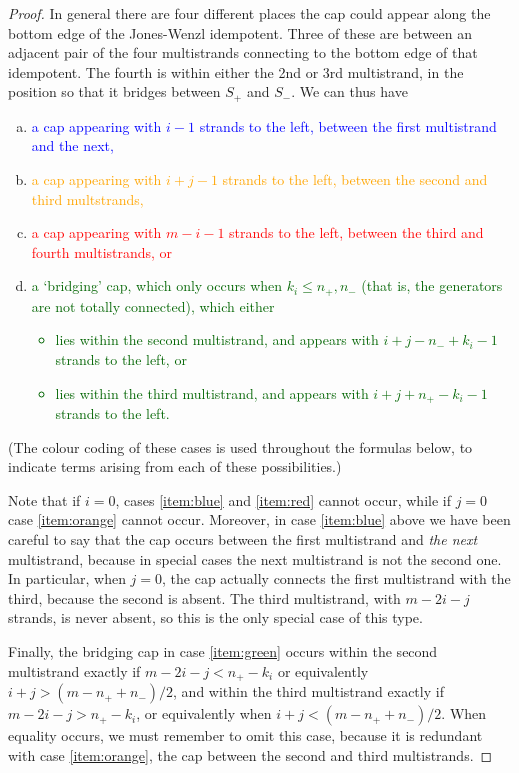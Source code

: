 \documentclass[12pt]{article}
\begin{document}
\begin{proof}
In general there are four different places the cap could appear along the bottom edge of the Jones-Wenzl idempotent. Three of these are between an adjacent pair of the four multistrands connecting to the bottom edge of that idempotent. The fourth is within either the 2nd or 3rd multistrand, in the position so that it bridges between $S_+$ and $S_-$.
We can thus have
\begin{enumerate}[(a)]
\item
\label{item:blue}
\textcolor{blue}{
a cap appearing with $i-1$ strands to the left, between the first multistrand and the next,
}
\item
\label{item:orange}
\textcolor{orange}{
a cap appearing with $i+j-1$ strands to the left, between the second and third multstrands,
}
\item
\label{item:red}
\textcolor{red}{
a cap appearing with $m-i-1$ strands to the left, between the third and fourth multistrands, or
}
\item
\label{item:green}
\textcolor{DarkGreen}{
a `bridging' cap, which only occurs when $k_i \leq n_+, n_-$ (that is, the generators are not totally connected),
which either
\begin{itemize}
\item lies within the second multistrand, and appears with $i+j-n_-+k_i - 1$ strands to the left, or
\item lies within the third multistrand, and appears with $i+j+n_+-k_i -1$ strands to the left.
\end{itemize}
}
\end{enumerate}
(The colour coding of these cases is used throughout the formulas below, to indicate terms arising from each of these possibilities.)

Note that if $i=0$, cases \eqref{item:blue} and \eqref{item:red} cannot occur, while if $j=0$ case \eqref{item:orange} cannot occur. Moreover, in case \eqref{item:blue} above we have been careful to say that the cap occurs between the first multistrand and \emph{the next} multistrand, because in special cases the next multistrand is not the second one. In particular, when $j=0$, the cap actually connects the first multistrand with the third, because the second is absent. The third multistrand, with $m-2i-j$ strands, is never absent, so this is the only special case of this type.

Finally, the bridging cap in case \eqref{item:green} occurs within the second multistrand exactly if $m-2i-j < n_+ - k_i$ or equivalently $i+j > (m - n_+ + n_-)/2$, and within the third multistrand exactly if $m-2i-j > n_+ - k_i$, or equivalently when $i+j < (m - n_+ + n_-)/2$. When equality occurs, we must remember to omit this case, because it is redundant with case \eqref{item:orange}, the cap between the second and third multistrands.


\end{proof}
\end{document}
